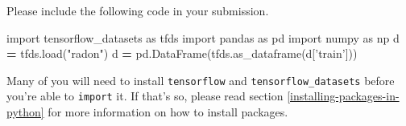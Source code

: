 \documentclass[12pt,krantz2]{krantz}
\makeatletter
\newenvironment{Shaded}{\begin{snugshade}}{\end{snugshade}}
\newcommand{\ImportTok}[1]{#1}
\newcommand{\NormalTok}[1]{#1}
\newcommand{\OperatorTok}[1]{\textcolor[rgb]{0.43,0.43,0.43}{\textbf{#1}}}
\newcommand{\StringTok}[1]{\textcolor[rgb]{0.5,0.5,0.5}{#1}}
\newenvironment{kframe}{%
\medskip{}
\setlength{\fboxsep}{.8em}
 \def\at@end@of@kframe{}%
 \ifinner\ifhmode%
  \def\at@end@of@kframe{\end{minipage}}%
  \begin{minipage}{\columnwidth}%
 \fi\fi%
 \def\FrameCommand##1{\hskip\@totalleftmargin \hskip-\fboxsep
 \colorbox{shadecolor}{##1}\hskip-\fboxsep
     \hskip-\linewidth \hskip-\@totalleftmargin \hskip\columnwidth}%
 \MakeFramed {\advance\hsize-\width
   \@totalleftmargin\z@ \linewidth\hsize
   \@setminipage}}%
 {\par\unskip\endMakeFramed%
 \at@end@of@kframe}
\renewenvironment{Shaded}{\begin{kframe}}{\end{kframe}}
\makeatother
\begin{document}
Please include the following code in your submission.

\begin{Shaded}
\begin{Highlighting}[]
\ImportTok{import}\NormalTok{ tensorflow_datasets }\ImportTok{as}\NormalTok{ tfds}
\ImportTok{import}\NormalTok{ pandas }\ImportTok{as}\NormalTok{ pd}
\ImportTok{import}\NormalTok{ numpy }\ImportTok{as}\NormalTok{ np}
\NormalTok{d }\OperatorTok{=}\NormalTok{ tfds.load(}\StringTok{"radon"}\NormalTok{)}
\NormalTok{d }\OperatorTok{=}\NormalTok{ pd.DataFrame(tfds.as_dataframe(d[}\StringTok{'train'}\NormalTok{]))}
\end{Highlighting}
\end{Shaded}

Many of you will need to install \texttt{tensorflow} and \texttt{tensorflow\_datasets} before you're able to \texttt{import} it. If that's so, please read section \ref{installing-packages-in-python} for more information on how to install packages.
\end{document}
